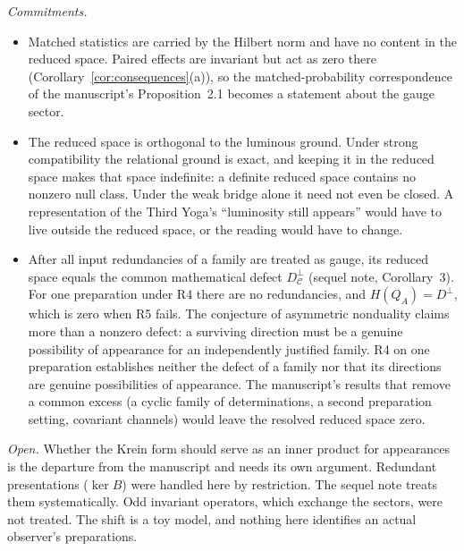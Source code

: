\documentclass[11pt]{article}
\theoremstyle{remark}
\begin{document}
\emph{Commitments.}
\begin{itemize}
\item[(i)] Matched statistics are carried by the Hilbert norm and have no content in the reduced space. Paired effects are invariant but act as zero there (Corollary~\ref{cor:consequences}(a)), so the matched-probability correspondence of the manuscript's Proposition~2.1 becomes a statement about the gauge sector.
\item[(ii)] The reduced space is orthogonal to the luminous ground. Under strong compatibility the relational ground is exact, and keeping it in the reduced space makes that space indefinite: a definite reduced space contains no nonzero null class. Under the weak bridge alone it need not even be closed. A representation of the Third Yoga's ``luminosity still appears'' would have to live outside the reduced space, or the reading would have to change.
\item[(iii)] After all input redundancies of a family are treated as gauge, its reduced space equals the common mathematical defect $D_{\mathcal C}^\perp$ (sequel note, Corollary~3). For one preparation under R4 there are no redundancies, and $H(Q_A)=D^\perp$, which is zero when R5 fails. The conjecture of asymmetric nonduality claims more than a nonzero defect: a surviving direction must be a genuine possibility of appearance for an independently justified family. R4 on one preparation establishes neither the defect of a family nor that its directions are genuine possibilities of appearance. The manuscript's results that remove a common excess (a cyclic family of determinations, a second preparation setting, covariant channels) would leave the resolved reduced space zero.
\end{itemize}

\emph{Open.} Whether the Krein form should serve as an inner product for appearances is the departure from the manuscript and needs its own argument. Redundant presentations ($\ker B$) were handled here by restriction. The sequel note treats them systematically. Odd invariant operators, which exchange the sectors, were not treated. The shift is a toy model, and nothing here identifies an actual observer's preparations.
\end{document}

